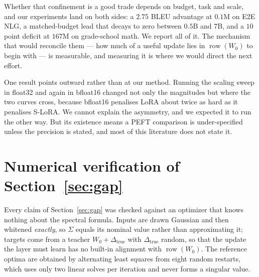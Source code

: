 \documentclass{article}
\theoremstyle{remark}
\begin{document}
Whether that confinement is a good trade depends on budget, task and scale, and
our experiments land on both sides: a $2.75$ BLEU advantage at $0.1$M on E2E
NLG, a matched-budget lead that decays to zero between $0.5$B and $7$B, and a
$10$ point deficit at $167$M on grade-school math. We report all of it. The
mechanism that would reconcile them --- how much of a useful update lies in
$\operatorname{row}(W_0)$ to begin with --- is measurable, and measuring it is
where we would direct the next effort.

One result points outward rather than at our method. Running the scaling sweep
in float32 and again in bfloat16 changed not only the magnitudes but where the
two curves cross, because bfloat16 penalises LoRA about twice as hard as it
penalises S-LoRA. We cannot explain the asymmetry, and we expected it to run the
other way. But its existence means a PEFT comparison is under-specified unless
the precision is stated, and most of this literature does not state it.

\appendix

\section{Numerical verification of Section~\ref{sec:gap}}
\label{app:numeric}
Every claim of Section~\ref{sec:gap} was checked against an optimizer that
knows nothing about the spectral formula. Inputs are drawn Gaussian and then
whitened \emph{exactly}, so $\Sigma$ equals its nominal value rather than
approximating it; targets come from a teacher $W_0+\Delta_{\mathrm{true}}$ with
$\Delta_{\mathrm{true}}$ random, so that the update the layer must learn has no
built-in alignment with $\operatorname{row}(W_0)$. The reference optima are
obtained by alternating least squares from eight random restarts, which uses
only two linear solves per iteration and never forms a singular value.
\end{document}
